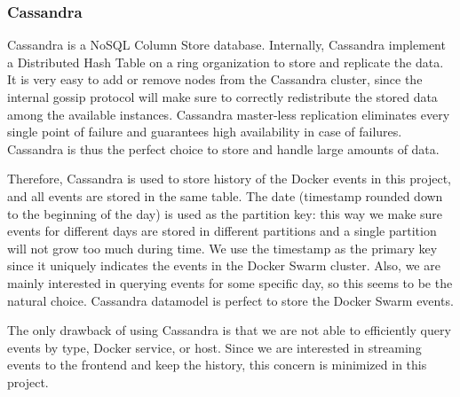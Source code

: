 \subsubsection{Cassandra}
Cassandra is a NoSQL Column Store database.
Internally, Cassandra implement a Distributed Hash Table on a ring organization to store and replicate the data. 
It is very easy to add or remove nodes from the Cassandra cluster, since the internal gossip protocol will make sure to correctly redistribute the stored data among the available instances.
Cassandra master-less replication eliminates every single point of failure and guarantees high availability in case of failures.
Cassandra is thus the perfect choice to store and handle large amounts of data.

Therefore, Cassandra is used to store history of the Docker events in this project, and all events are stored in the same table.
The date (timestamp rounded down to the beginning of the day) is used as the partition key:
this way we make sure events for different days are stored in different partitions and a single partition will not grow too much during time.
We use the timestamp as the primary key since it uniquely indicates the events in the Docker Swarm cluster.
Also, we are mainly interested in querying events for some specific day, so this seems to be the natural choice.
Cassandra datamodel is perfect to store the Docker Swarm events.

The only drawback of using Cassandra is that we are not able to efficiently query events by type, Docker service, or host.
Since we are interested in streaming events to the frontend and keep the history, this concern is minimized in this project.
